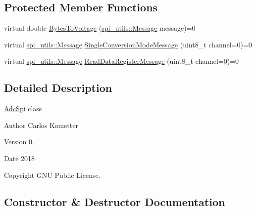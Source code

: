 \subsection*{Protected Member Functions}
\begin{DoxyCompactItemize}
\item 
virtual double \mbox{\hyperlink{classAdcSpi_a25a1deb55a9f0e71a405ca47a41f3804}{Bytes\+To\+Voltage}} (\mbox{\hyperlink{structspi__utils_1_1Message}{spi\+\_\+utils\+::\+Message}} message)=0
\item 
virtual \mbox{\hyperlink{structspi__utils_1_1Message}{spi\+\_\+utils\+::\+Message}} \mbox{\hyperlink{classAdcSpi_a369da36232861640a113792d2398ce44}{Single\+Conversion\+Mode\+Message}} (uint8\+\_\+t channel=0)=0
\item 
virtual \mbox{\hyperlink{structspi__utils_1_1Message}{spi\+\_\+utils\+::\+Message}} \mbox{\hyperlink{classAdcSpi_a3578f18e1976d9e2b075a3fbdc003517}{Read\+Data\+Register\+Message}} (uint8\+\_\+t channel=0)=0
\end{DoxyCompactItemize}


\subsection{Detailed Description}
\mbox{\hyperlink{classAdcSpi}{Adc\+Spi}} class \begin{DoxyAuthor}{Author}
Carlos Kometter 
\end{DoxyAuthor}
\begin{DoxyVersion}{Version}
0. 
\end{DoxyVersion}
\begin{DoxyDate}{Date}
2018 
\end{DoxyDate}
\begin{DoxyCopyright}{Copyright}
G\+NU Public License. 
\end{DoxyCopyright}


\subsection{Constructor \& Destructor Documentation}
\mbox{\label{classAdcSpi_a78b3bf970d85febda92dd343cca687a1}} 
